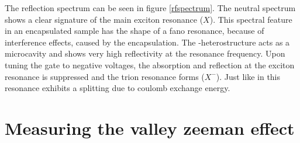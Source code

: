 The reflection spectrum can be seen in figure \ref{rfspectrum}. The neutral spectrum shows a clear signature of the main exciton resonance ($X$). This spectral feature in an \hbng encapsulated sample has the shape of a fano resonance, because of interference effects, caused by the encapsulation. The \tmd-\hbng heterostructure acts as a microcavity and shows very high reflectivity at the resonance frequency\cite{scuri_large_2018}. Upon tuning the gate to negative voltages, the absorption and reflection at the exciton resonance is suppressed and the trion resonance forms ($X^-$). Just like in \pl this resonance exhibits a splitting due to coulomb exchange energy. 


\section{Measuring the valley zeeman effect}
